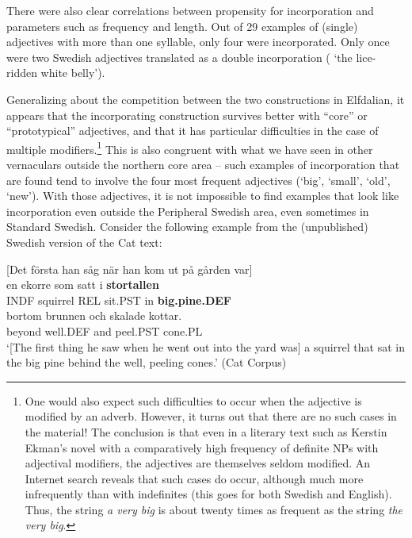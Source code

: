 {%

There were also clear correlations between propensity for incorporation and parameters such as frequency and length. Out of 29 examples of (single) adjectives with more than one syllable, only four were incorporated. Only once were two Swedish adjectives translated as a double incorporation ( ‘the lice-ridden white belly’).


Generalizing about the competition between the two constructions in Elfdalian, it appears that the incorporating construction survives better with “core” or “prototypical” adjectives, and that it has particular difficulties in the case of multiple modifiers.\footnote{ One would also expect such difficulties to occur when the adjective is modified by an adverb. However, it turns out that there are no such cases in the material! The conclusion is that even in a literary text such as Kerstin Ekman’s novel with a comparatively high frequency of definite NPs with adjectival modifiers, the adjectives are themselves seldom modified. An Internet search reveals that such cases do occur, although much more infrequently than with indefinites (this goes for both Swedish and English). Thus, the string \textit{a very big} is about twenty times as frequent as the string \textit{the very big}.} This is also congruent with what we have seen in other vernaculars outside the northern core area – such examples of incorporation that are found tend to involve the four most frequent adjectives (‘big’, ‘small’, ‘old’, ‘new’). With those adjectives, it is not impossible to find examples that look like incorporation even outside the Peripheral Swedish area, even sometimes in Standard Swedish. Consider the following example from the (unpublished) Swedish version of the Cat text:


\ea\label{}
{}[Det första han såg när han kom ut på gården var]\\
\gll en  ekorre  som  satt  i  \textbf{stortallen}\\
INDF  squirrel  REL  sit.PST  in  \textbf{big.pine.DEF}\\
\gll bortom  brunnen  och  skalade  kottar.\\
beyond  well.DEF  and  peel.PST  cone.PL\\
\glt ‘[The first thing he saw when he went out into the yard was] a squirrel that sat in the big pine behind the well, peeling cones.’ (Cat Corpus)
\z

}
